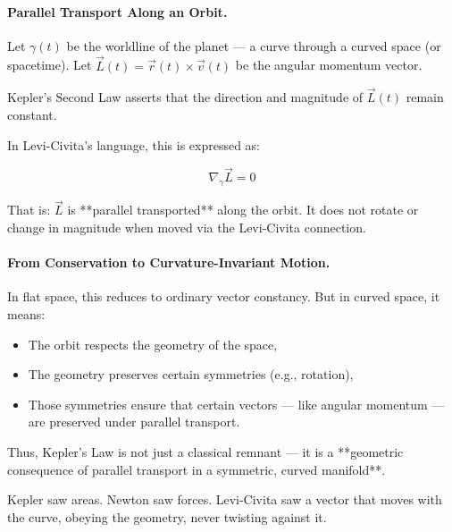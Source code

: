\bigskip

\paragraph{Parallel Transport Along an Orbit.}

Let \( \gamma(t) \) be the worldline of the planet — a curve through a curved space (or spacetime).  
Let \( \vec{L}(t) = \vec{r}(t) \times \vec{v}(t) \) be the angular momentum vector.

Kepler’s Second Law asserts that the direction and magnitude of \( \vec{L}(t) \) remain constant.

In Levi-Civita’s language, this is expressed as:

\[
\nabla_{\dot{\gamma}} \vec{L} = 0
\]

That is: \( \vec{L} \) is **parallel transported** along the orbit.  
It does not rotate or change in magnitude when moved via the Levi-Civita connection.

\bigskip

\paragraph{From Conservation to Curvature-Invariant Motion.}

In flat space, this reduces to ordinary vector constancy.  
But in curved space, it means:

\begin{itemize}
    \item The orbit respects the geometry of the space,
    \item The geometry preserves certain symmetries (e.g., rotation),
    \item Those symmetries ensure that certain vectors — like angular momentum — are preserved under parallel transport.
\end{itemize}

Thus, Kepler’s Law is not just a classical remnant —  
it is a **geometric consequence of parallel transport in a symmetric, curved manifold**.

\bigskip

\begin{tcolorbox}[colback=blue!5!white, colframe=blue!80!black, title=\textbf{Levi-Civita’s Take on Kepler}]
Kepler saw areas.  
Newton saw forces.  
Levi-Civita saw a vector that moves with the curve,  
obeying the geometry, never twisting against it.
\end{tcolorbox}

